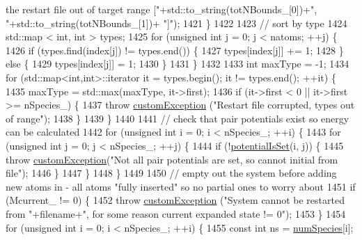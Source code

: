 \begin{DoxyCode}
{       the restart file out of target range ["}+std::to\_string(totNBounds\_[0])+\textcolor{stringliteral}{", "}+std::to\_string(totNBounds\_[1])+\textcolor{stringliteral}{
      "]"});
1421     \}
1422 
1423     \textcolor{comment}{// sort by type}
1424     std::map < int, int > types;
1425     \textcolor{keywordflow}{for} (\textcolor{keywordtype}{unsigned} \textcolor{keywordtype}{int} j = 0; j < natoms; ++j) \{
1426         \textcolor{keywordflow}{if} (types.find(index[j]) != types.end()) \{
1427             types[index[j]] += 1;
1428         \} \textcolor{keywordflow}{else} \{
1429             types[index[j]] = 1;
1430         \}
1431     \}
1432 
1433     \textcolor{keywordtype}{int} maxType = -1;
1434     \textcolor{keywordflow}{for} (std::map<int,int>::iterator it = types.begin(); it != types.end(); ++it) \{
1435         maxType = std::max(maxType, it->first);
1436         \textcolor{keywordflow}{if} (it->first < 0 || it->first >= nSpecies\_) \{
1437             \textcolor{keywordflow}{throw} \hyperlink{classcustom_exception}{customException} (\textcolor{stringliteral}{"Restart file corrupted, types out of range"});
1438         \}
1439     \}
1440 
1441     \textcolor{comment}{// check that pair potentials exist so energy can be calculated}
1442     \textcolor{keywordflow}{for} (\textcolor{keywordtype}{unsigned} \textcolor{keywordtype}{int} i = 0; i < nSpecies\_; ++i) \{
1443         \textcolor{keywordflow}{for} (\textcolor{keywordtype}{unsigned} \textcolor{keywordtype}{int} j = 0; j < nSpecies\_; ++j) \{
1444             \textcolor{keywordflow}{if} (!\hyperlink{classsim_system_a40af191fae6091e26413ee06ae188ae9}{potentialIsSet}(i, j)) \{
1445                 \textcolor{keywordflow}{throw} \hyperlink{classcustom_exception}{customException}(\textcolor{stringliteral}{"Not all pair potentials are set, so cannot initial
       from file"});
1446             \}
1447         \}
1448     \}
1449 
1450     \textcolor{comment}{// empty out the system before adding new atoms in - all atoms "fully inserted" so no partial ones to
       worry about}
1451     \textcolor{keywordflow}{if} (Mcurrent\_ != 0) \{
1452         \textcolor{keywordflow}{throw} \hyperlink{classcustom_exception}{customException} (\textcolor{stringliteral}{"System cannot be restarted from "}+filename+\textcolor{stringliteral}{", for some
       reason current expanded state != 0"});
1453     \}
1454     \textcolor{keywordflow}{for} (\textcolor{keywordtype}{unsigned} \textcolor{keywordtype}{int} i = 0; i < nSpecies\_; ++i) \{
1455         \textcolor{keyword}{const} \textcolor{keywordtype}{int} ns = \hyperlink{classsim_system_a9eea865e6dc1cff377b1e79c4d9c23f0}{numSpecies}[i];

\end{DoxyCode}
